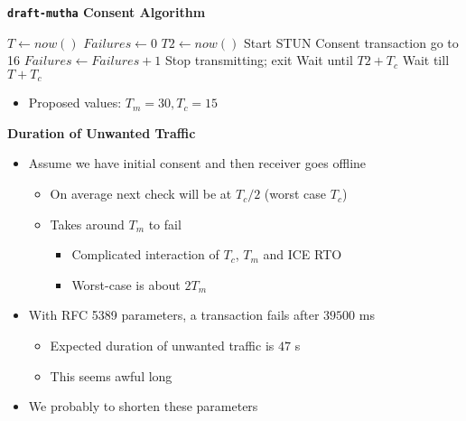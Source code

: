 \documentclass[helvetica]{seminar}
\newcommand{\heading}[1]{%
  \begin{center} 
    \large\bf 
    #1 
  \end{center} 
  \vspace{.4 in}}
\begin{document}
\begin{slide}

\heading{\texttt{draft-mutha} Consent Algorithm}

{\scriptsize
\begin{algorithmic}[1]
  \Repeat  
     \State $T \gets now()$
     \State $Failures \gets 0$
     \Repeat
     \State $T2 \gets now()$
     \State Start STUN Consent transaction
        \State go to 16
     \EndIf
     \State $Failures \gets Failures + 1$
         \State Stop transmitting; exit
     \EndIf
     \State Wait until $T2 + T_c$
     \State Wait till $T + T_c$
\end{algorithmic}
}

\begin{itemize}
\item Proposed values: $T_m = 30, T_c = 15$
\end{itemize}

\end{slide}


\begin{slide}
\heading{Duration of Unwanted Traffic}

\begin{itemize}
\item Assume we have initial consent and then receiver goes offline
  \begin{itemize}
  \item On average next check will be at $T_c/2$ (worst case $T_c$)
  \item Takes around $T_m$ to fail
    \begin{itemize}
    \item Complicated interaction of $T_c$, $T_m$ and ICE RTO
    \item Worst-case is about $2T_m$
    \end{itemize}

\end{itemize}

\item With RFC 5389 parameters, a transaction fails after $39500$ ms
  \begin{itemize}
  \item Expected duration of unwanted traffic is $47$ s
  \item This seems awful long
  \end{itemize}

\item We probably to shorten these parameters
\end{itemize}
\end{slide}
\end{document}
